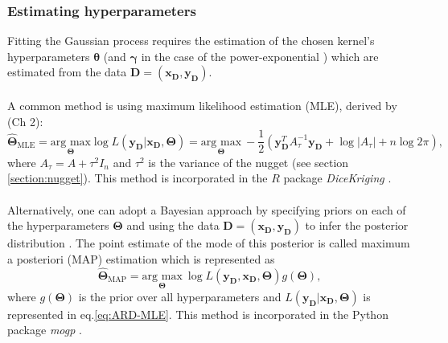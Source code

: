 \documentclass{article}
\newcommand{\inputVec}{\mathbf{x}}
\newcommand{\outputVec}{\mathbf{y}}
\newcommand{\designInput}{\inputVec_\design}
\newcommand{\designOutput}{\outputVec_\design}
\newcommand{\design}{\mathbf{D}}
\newcommand{\corrMatrix}{A}
\newcommand{\nugVar}{\tau^2}
\newcommand{\nugSD}{\tau}
\newcommand{\lengthscale}{\mathbf{\theta}}
\newcommand{\hyp}{\mathbf{\Theta}}
\newcommand{\hypEst}{\hat{\mathbf{\Theta}}}
\newcommand{\likelihood}{L}
\newcommand{\numDPs}{n}
\begin{document}
\subsubsection{Estimating hyperparameters}
\label{section:hyperparameters}
Fitting the Gaussian process requires the estimation of the chosen kernel's hyperparameters $\lengthscale$ (and $\mathbf{\gamma}$ in the case of the power-exponential \citep{Kennedy2001}) which are estimated from the data $\design = (\designInput,\designOutput)$.\\\\
A common method is using maximum likelihood estimation (MLE), derived by \citet{Rasmussen_Williams_2006}(Ch 2):
\begin{equation}
    \label{eq:ARD-MLE}
    \hypEst_{\text{MLE}} = \underset{\hyp}{\text{arg max}} \log \likelihood(\designOutput|\designInput,\hyp) = \underset{\hyp}{\text{arg max}} \ -\frac{1}{2} \left(\designOutput^T \corrMatrix_{\nugSD}^{-1} \mathbf{\designOutput} + \log|\corrMatrix_\nugSD| + \numDPs \log 2\pi \right),
\end{equation}
where $\corrMatrix_\nugSD = \corrMatrix + \nugVar I_\numDPs$ and $\nugVar$ is the variance of the nugget (see section \ref{section:nugget}). This method is incorporated in the $R$ package {\it DiceKriging} \citep{DiceKriging}.\\\\
Alternatively, one can adopt a Bayesian approach by specifying priors on each of the hyperparameters $\hyp$ and using the data $\design = (\designInput,\designOutput)$ to infer the posterior distribution \citep{Higdon2004}. The point estimate of the mode of this posterior is called maximum a posteriori (MAP) estimation which is represented as
\begin{equation}
    \hypEst_{\text{MAP}} = \underset{\hyp}{\text{arg max}} \ \log \likelihood(\designOutput,\designInput,\hyp) g(\hyp),
    \label{eq:ARD-MAP}
\end{equation}
where $g(\hyp)$ is the prior over all hyperparameters and $\likelihood(\designOutput|\designInput,\hyp)$ is represented in eq.\eqref{eq:ARD-MLE}. This method is incorporated in the Python package {\it mogp} \citep{mogptk}.
\end{document}
